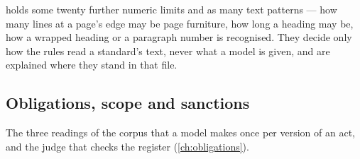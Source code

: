  holds some twenty further numeric limits and as many text patterns --- how many lines at a page's
edge may be page furniture, how long a heading may be, how a wrapped heading or a paragraph
number is recognised. They decide only how the rules read a standard's text, never what a
model is given, and are explained where they stand in that file.


\subsection{Obligations, scope and sanctions}\label{sec:config:obligations}

The three readings of the corpus that a model makes once per version of an act, and the judge
that checks the register (\cref{ch:obligations}).

